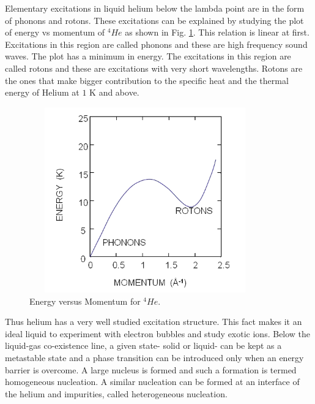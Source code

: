 Elementary excitations in liquid helium below the lambda point are in the form of phonons and rotons. These excitations can be explained by studying the plot of energy vs momentum of $^4He$ as shown in Fig. \ref{elementaryExcitation}. This relation is linear at first. Excitations in this region are called phonons and these are high frequency sound waves. The plot has a minimum in energy. The excitations in this region are called rotons and these are excitations with very short wavelengths. Rotons are the ones that make bigger contribution to the specific heat and the thermal energy of Helium at $1$ K and above.
\begin{figure}[H]
\centering 
\includegraphics[width=100mm, height=80mm]{Nucleation_Experiment/elementaryexcitations.png}
\caption{Energy versus Momentum for $^4He$. \cite{rotonFig}}
\label{elementaryExcitation}
\end{figure}

Thus helium has a very well studied excitation structure. This fact makes it an ideal liquid to experiment with electron bubbles and study exotic ions. Below the liquid-gas co-existence line, a given state- solid or liquid- can be kept as a metastable state and a phase transition can be introduced only when an energy barrier is overcome. A large nucleus is formed and such a formation is termed homogeneous nucleation. A similar nucleation can be formed at an interface of the helium and impurities, called heterogeneous nucleation.


